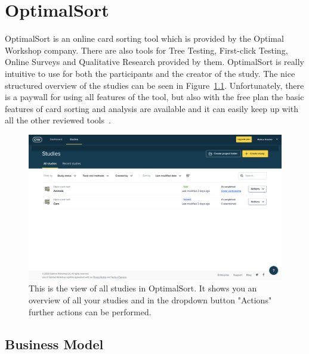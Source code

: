 \chapter{OptimalSort}

\label{chap:OptimalSort}


OptimalSort is an online card sorting tool which is provided by the 
Optimal Workshop company. There are also tools for Tree Testing, 
First-click Testing, Online Surveys and Qualitative Research 
provided by them. OptimalSort is really intuitive to use for both 
the participants and the creator of the study. The nice structured 
overview of the studies can be seen in 
Figure~\ref{fig:OptimalSort1}.
Unfortunately, there is a paywall for using all features of the tool, 
but also with the free plan the basic features of card sorting and 
analysis are available and it can easily keep up with all the other 
reviewed tools~\parencite{OptimalSort}.



\begin{figure}[tp] 
\centering
\includegraphics[keepaspectratio,width=\linewidth,height=\halfh]{images/optimalsort-studies.png}
\caption[OptimalSort Application] { This is the view of all studies in OptimalSort.
It shows you an overview of all your studies and in the dropdown button "Actions"
further actions can be performed.
 }
\label{fig:OptimalSort1}
\end{figure}



\section{Business Model}

